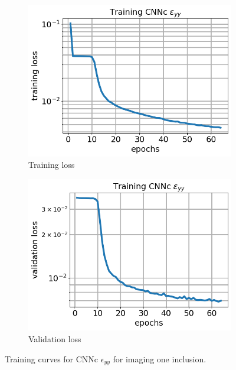 \documentclass[12pt]{article}
\newcommand{\nhgfigheight}{4.0cm}
\begin{document}
\begin{figure}[h]
  \centering
  \begin{subfigure}[b]{0.45\linewidth}
    \includegraphics[totalheight=\nhgfigheight]{Figures/final1c/training/eyy/field_strainyy_plot_loss.png}
    \caption{Training loss}
  \end{subfigure}
  \begin{subfigure}[b]{0.45\linewidth}
    \includegraphics[totalheight=\nhgfigheight]{Figures/final1c/training/eyy/field_strainyy_plot_val_loss.png}
    \caption{Validation loss}
  \end{subfigure}
\caption{\label{fig:oneinctanh:traineyy} Training curves for CNNc $\epsilon_{yy}$ for imaging one inclusion.}
\end{figure}
\end{document}
